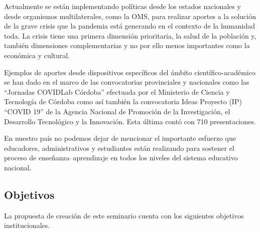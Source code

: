 \documentclass{article}
\begin{document}

%



Actualmente se están implementando políticas desde los estados nacionales y desde organismos multilaterales, como la OMS, para realizar aportes a la solución de la grave crisis que la pandemia está generando en el contexto de la humanidad toda. La crisis tiene una primera dimensión  prioritaria, la salud de la población y, también dimensiones complementarias y no por ello menos importantes como la económica y cultural.

 Ejemplos de aportes desde dispositivos específicos del ámbito científico-académico  se han dado en el marco de las convocatorias provinciales y nacionales  como las ``Jornadas COVIDLab Córdoba'' efectuada por el Ministerio de Ciencia y Tecnología de Córdoba como así también la convocatoria Ideas Proyecto (IP) ``COVID 19''  de la Agencia Nacional de Promoción de la Investigación, el Desarrollo Tecnológico y la Innovación. Esta última contó con 710 presentaciones. 
 
 
 En nuestro país no podemos dejar de mencionar el importante esfuerzo que educadores, administrativos y estudiantes están realizando para sostener el proceso de enseñanza--aprendizaje en todos los niveles del sistema educativo nacional.



\subsection{Objetivos}

La propuesta de creación de este seminario cuenta con los siguientes objetivos institucionales.
\end{document}
